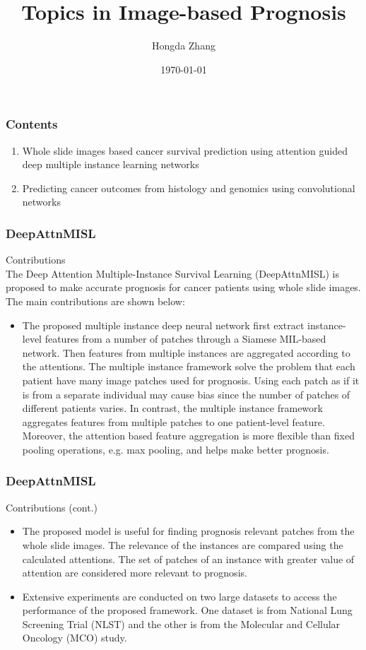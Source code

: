 \documentclass{beamer}
\title[]{Topics in Image-based Prognosis}
\author[Hongda Zhang]{Hongda Zhang}
\institute{Nanjing University}
\date{\today}
\begin{document}
	\begin{frame}
		\titlepage
	\end{frame}
	
	\begin{frame}
		\frametitle{Contents}
		\begin{enumerate}
			\item Whole slide images based cancer survival prediction using attention guided deep multiple instance learning networks
			\item Predicting cancer outcomes from histology and genomics using convolutional networks
		\end{enumerate}
		\nocite{*}
	\end{frame}
	
	\begin{frame}
		\frametitle{DeepAttnMISL}
		Contributions \\
		\vspace{5mm}
		The Deep Attention Multiple-Instance Survival Learning (DeepAttnMISL) is proposed to make accurate prognosis for cancer patients using whole slide images. The main contributions are shown below:
		\begin{itemize}
			\item The proposed multiple instance deep neural network first extract instance-level features from a number of patches through a Siamese MIL-based network. Then features from multiple instances are aggregated according to the attentions. The multiple instance framework solve the problem that each patient have many image patches used for prognosis. Using each patch as if it is from a separate individual may cause bias since the number of patches of different patients varies. In contrast, the multiple instance framework aggregates features from multiple patches to one patient-level feature. Moreover, the attention based feature aggregation is more flexible than fixed pooling operations, e.g. max pooling, and helps make better prognosis. 
		\end{itemize}
	\end{frame}
	
	\begin{frame}
		\frametitle{DeepAttnMISL}
		Contributions (cont.) 
		\begin{itemize}
			\item The proposed model is useful for finding prognosis relevant patches from the whole slide images. The relevance of the instances are compared using the calculated attentions. The set of patches of an instance with greater value of attention are considered more relevant to prognosis.
			\item Extensive experiments are conducted on two large datasets to access the performance of the proposed framework. One dataset is from National Lung Screening Trial (NLST) and the other is from the Molecular and Cellular Oncology (MCO) study.
		\end{itemize}
	\end{frame}
\end{document}
